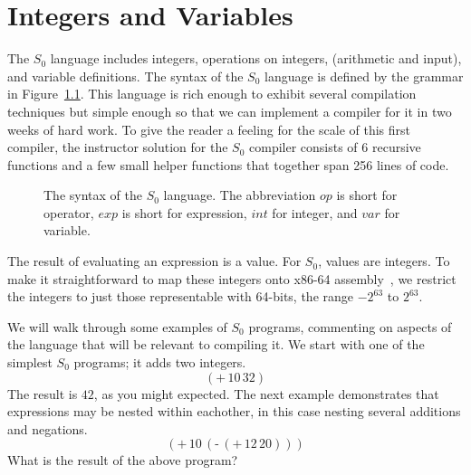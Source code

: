 \documentclass[10pt]{book}
\makeatletter
\newenvironment{chapquote}[2][2em]
  {\setlength{\@tempdima}{#1}%
   \def\chapquote@author{#2}%
   \parshape 1 \@tempdima \dimexpr\textwidth-2\@tempdima\relax%
   \itshape}
  {\par\normalfont\hfill--\ \chapquote@author\hspace*{\@tempdima}\par\bigskip}
\newcommand{\itm}[1]{\ensuremath{\mathit{#1}}}
\newcommand{\Exp}{\itm{exp}}
\newcommand{\Int}{\itm{int}}
\newcommand{\Var}{\itm{var}}
\newcommand{\Op}{\itm{op}}
\newcommand{\key}[1]{\texttt{#1}}
\newcommand{\UNIOP}[2]{(\key{#1}\,#2)}
\newcommand{\BINOP}[3]{(\key{#1}\,#2\,#3)}
\newcommand{\LET}[3]{(\key{let}\,([#1\;#2])\,#3)}
\makeatother
\begin{document}

\chapter{Integers and Variables}


The $S_0$ language includes integers, operations on integers,
(arithmetic and input), and variable definitions.  The syntax of the
$S_0$ language is defined by the grammar in
Figure~\ref{fig:s0-syntax}. This language is rich enough to exhibit
several compilation techniques but simple enough so that we can
implement a compiler for it in two weeks of hard work.  To give the
reader a feeling for the scale of this first compiler, the instructor
solution for the $S_0$ compiler consists of 6 recursive functions and
a few small helper functions that together span 256 lines of code.

\begin{figure}[htbp]
\centering
\fbox{
\begin{minipage}{0.85\textwidth}
\[
\begin{array}{lcl}
  \Op  &::=& \key{+} \mid \key{-} \mid \key{*} \mid \key{read} \\
  \Exp &::=& \Int \mid (\Op \; \Exp^{+}) \mid \Var \mid \LET{\Var}{\Exp}{\Exp}
\end{array}
\]
\end{minipage}
}
\caption{The syntax of the $S_0$ language. The abbreviation \Op{} is
  short for operator, \Exp{} is short for expression, \Int{} for integer,
  and \Var{} for variable.}
\label{fig:s0-syntax}
\end{figure}

The result of evaluating an expression is a value.  For $S_0$, values
are integers. To make it straightforward to map these integers onto
x86-64 assembly~\citep{Matz:2013aa}, we restrict the integers to just
those representable with 64-bits, the range $-2^{63}$ to $2^{63}$.

We will walk through some examples of $S_0$ programs, commenting on
aspects of the language that will be relevant to compiling it.  We
start with one of the simplest $S_0$ programs; it adds two integers.
\[
\BINOP{+}{10}{32}
\]
The result is $42$, as you might expected. 
%
The next example demonstrates that expressions may be nested within
eachother, in this case nesting several additions and negations.
\[
\BINOP{+}{10}{ \UNIOP{-}{ \BINOP{+}{12}{20} } }
\]
What is the result of the above program?
\end{document}
